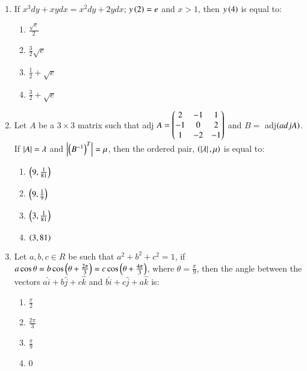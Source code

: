 \documentclass[journal,9pt,twocolumn]{IEEEtran}
\begin{document}
\begin{enumerate}
    \item  If $x^3dy + xydx = x^2dy + 2ydx$; $y\left(2\right) = e$ and $x > 1$, then $y\left(4\right)$ is equal to:
        
        \begin{multicols}{4}
\begin{enumerate}
    \item $\frac{\sqrt{e}}{2}$
    \item $\frac{3}{2} \sqrt{e}$
    \item $\frac{1}{2} + \sqrt{e}$
    \item $\frac{3}{2} + \sqrt{e}$
\end{enumerate}
\end{multicols}

\item Let $A$ be a $3 \times 3$ matrix such that adj $A = \begin{pmatrix}2 &-1& 1\\-1& 0& 2\\1& -2& -1\end{pmatrix}$ 
and $B =$ adj$\left(adj  A\right)$. If $\left\vert A\right\vert = \lambda$ and $\left\vert\left(B^{-1}\right)^T\right\vert = \mu$, then the ordered pair, $\left(\left\vert\lambda\right\vert, \mu\right)$ is equal to:

        \begin{multicols}{2}

\begin{enumerate}
    \item $\left(9, \frac{1}{81}\right)$
    \item $\left(9, \frac{1}{9}\right)$
    \item $\left(3, \frac{1}{81}\right)$
    \item $\left(3, 81\right)$
\end{enumerate}
\end{multicols}

\item Let $a, b, c \in R$ be such that $a^2 + b^2 + c^2 = 1$, if $a \cos \theta = b \cos\left(\theta + \frac{2\pi}{3}\right) = c \cos\left(\theta + \frac{4\pi}{3}\right)$, where $\theta = \frac{\pi}{9}$, then the angle between the vectors $a\hat{i} + b\hat{j} + c\hat{k}$ and $b\hat{i} + c\hat{j}+ a\hat{k} $ is:
        \begin{multicols}{4}

\begin{enumerate}
    \item $\frac{\pi}{2}$
    \item $\frac{2\pi}{3}$
    \item $\frac{\pi}{9}$
    \item $0$
\end{enumerate}
\end{multicols}


\end{enumerate}
\end{document}
